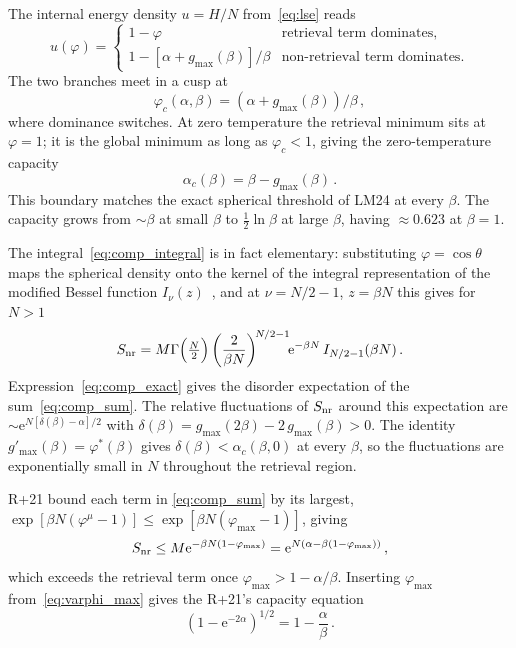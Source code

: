 \documentclass[letterpaper]{article} %
\newcommand{\e}{{\mathrm{e}}}
\newcommand{\Bnet}{\beta}
\newcommand{\ac}{\alpha_c}
\begin{document}
The internal energy density $u = H/N$ from~\eqref{eq:lse} reads
\begin{equation}
    u(\varphi) = \begin{cases}
        1 - \varphi & \text{retrieval term dominates}, \\
        1 - [\alpha + g_{\max}(\Bnet)]/\Bnet & \text{non-retrieval term dominates}.
    \end{cases}
    \label{eq:u_piecewise}
\end{equation}
The two branches meet in a cusp at
\begin{equation}
\varphi_c(\alpha, \Bnet) = (\alpha + g_{\max}(\Bnet))/\Bnet\,,
\label{eq:cusp}
\end{equation}
where dominance switches. At zero temperature the retrieval minimum sits at
$\varphi = 1$; it is the global minimum as long as $\varphi_c < 1$, giving the
zero-temperature capacity
\begin{equation}
\ac(\Bnet) = \Bnet - g_{\max}(\Bnet)\,.
\label{eq:capacity_T0}
\end{equation}
This boundary matches the exact spherical threshold of LM24 at every $\Bnet$. The capacity grows from $\sim\Bnet$ at small $\Bnet$ to $\tfrac12 \ln\Bnet$ at
large $\Bnet$, having $\approx 0.623$ at $\Bnet = 1$.

The integral~\eqref{eq:comp_integral} is in fact elementary: substituting $\varphi = \cos\theta$ maps the spherical density onto the kernel of the integral representation of the modified Bessel function $I_\nu(z)$~\citep[8.431.3]{gradshteyn2015}, and at $\nu = N/2 - 1$, $z = \Bnet N$ this gives for $N > 1$
\begin{equation}
S_{\rm nr} = M \Gamma\Big(\tfrac{N}{2}\Big)\left(\frac{2}{\Bnet N}\right)^{\!N/2-1}\!\!\e^{-\Bnet N}\,I_{N/2-1}(\Bnet N)\,.
\label{eq:comp_exact}
\end{equation}
Expression~\eqref{eq:comp_exact} gives the disorder expectation of the sum~\eqref{eq:comp_sum}. The relative fluctuations of $S_{\rm nr}$ around this expectation are $\sim \e^{N[\delta(\Bnet) - \alpha]/2}$ with $\delta(\Bnet) = g_{\max}(2\Bnet) - 2\,g_{\max}(\Bnet) > 0$. The identity $g'_{\max}(\Bnet) = \varphi^*(\Bnet)$ gives $\delta(\Bnet) < \ac(\Bnet, 0)$ at every $\Bnet$, so the fluctuations are exponentially small in $N$ throughout the retrieval region.

R+21 bound each term in \eqref{eq:comp_sum} by its largest, $\exp[\Bnet N(\varphi^\mu - 1)] \leq \exp[\Bnet N(\varphi_{\max} - 1)]$, giving
\begin{equation}
    S_{\rm nr} \leq M\e^{-\Bnet N(1-\varphi_{\max})} = \e^{N(\alpha - \Bnet(1-\varphi_{\max}))}\,,
    \label{eq:ramsauer_bound}
\end{equation}
which exceeds the retrieval term once $\varphi_{\max} > 1 - \alpha/\Bnet$. Inserting $\varphi_{\max}$ from~\eqref{eq:varphi_max} gives the R+21's capacity equation
\begin{equation}
    (1 - \e^{-2\alpha})^{1/2} = 1 - \frac{\alpha}{\Bnet}\,.
    \label{eq:ramsauer_capacity}
\end{equation}
\end{document}
